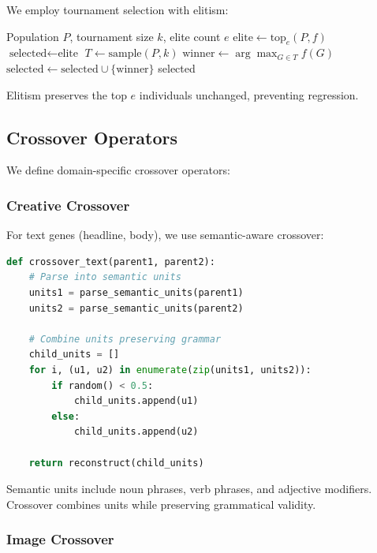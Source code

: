 \documentclass[11pt,twocolumn]{article}
\begin{document}
We employ tournament selection with elitism:

\begin{algorithm}
\caption{Tournament Selection}
\begin{algorithmic}[1]
\REQUIRE Population $P$, tournament size $k$, elite count $e$
\STATE $\text{elite} \leftarrow \text{top}_e(P, f)$
\STATE $\text{selected} \leftarrow \text{elite}$
    \STATE $T \leftarrow \text{sample}(P, k)$
    \STATE $\text{winner} \leftarrow \arg\max_{G \in T} f(G)$
    \STATE $\text{selected} \leftarrow \text{selected} \cup \{\text{winner}\}$
\ENDWHILE
\RETURN selected
\end{algorithmic}
\end{algorithm}

Elitism preserves the top $e$ individuals unchanged, preventing regression.

\subsection{Crossover Operators}

We define domain-specific crossover operators:

\subsubsection{Creative Crossover}

For text genes (headline, body), we use semantic-aware crossover:

\begin{lstlisting}[language=Python,caption=Semantic text crossover]
def crossover_text(parent1, parent2):
    # Parse into semantic units
    units1 = parse_semantic_units(parent1)
    units2 = parse_semantic_units(parent2)

    # Combine units preserving grammar
    child_units = []
    for i, (u1, u2) in enumerate(zip(units1, units2)):
        if random() < 0.5:
            child_units.append(u1)
        else:
            child_units.append(u2)

    return reconstruct(child_units)
\end{lstlisting}

Semantic units include noun phrases, verb phrases, and adjective modifiers. Crossover combines units while preserving grammatical validity.

\subsubsection{Image Crossover}
\end{document}
